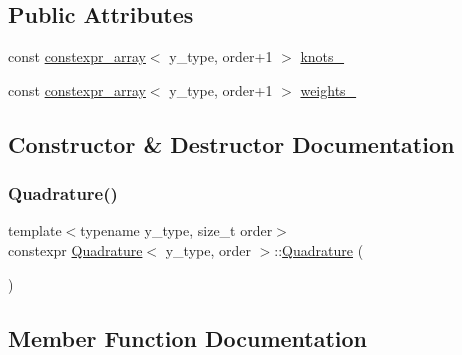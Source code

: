 \subsection*{Public Attributes}
\begin{DoxyCompactItemize}
\item 
const \hyperlink{classconstexpr__array}{constexpr\+\_\+array}$<$ y\+\_\+type, order+1 $>$ \hyperlink{class_quadrature_ac953b6311f9120fd2c0d8e5bc0d47a8a}{knots\+\_\+}
\item 
const \hyperlink{classconstexpr__array}{constexpr\+\_\+array}$<$ y\+\_\+type, order+1 $>$ \hyperlink{class_quadrature_a333f9daea5b493b74ded779ae4a7c8c9}{weights\+\_\+}
\end{DoxyCompactItemize}


\subsection{Constructor \& Destructor Documentation}
\mbox{\label{class_quadrature_a0856d3ef4be07d572fd94d34f60ae6cb}} 
\subsubsection{\texorpdfstring{Quadrature()}{Quadrature()}}
{\footnotesize\ttfamily template$<$typename y\+\_\+type, size\+\_\+t order$>$ \\
constexpr \hyperlink{class_quadrature}{Quadrature}$<$ y\+\_\+type, order $>$\+::\hyperlink{class_quadrature}{Quadrature} (\begin{DoxyParamCaption}{ }\end{DoxyParamCaption})\hspace{0.3cm}{\ttfamily [inline]}}



\subsection{Member Function Documentation}
\mbox{\label{class_quadrature_a924d121900f371d20e84fb3d5277ba4d}} 
